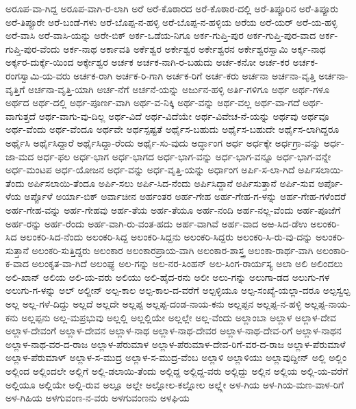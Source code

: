 ಅರೂಪ-ವಾ-ಗಿದ್ದ
ಅರೂಪ-ವಾಗಿ-ರ-ಲಾಗಿ
ಅರೆ
ಅರೆ-ಕೊಠಾರದ
ಅರೆ-ಕೊಠಾರ-ದಲ್ಲಿ
ಅರೆ-ತಿಪ್ಪೂರಿನ
ಅರೆ-ತಿಪ್ಪೂರು
ಅರೆ-ತಿಪ್ಪೂರೇ
ಅರೆ-ಬಂಡೆ-ಗಳು
ಅರೆ-ಬೊಪ್ಪ-ನ-ಹಳ್ಳಿ
ಅರೆ-ಬೊಪ್ಪ-ನ-ಹಳ್ಳಿಯ
ಅರೆಯ
ಅರೆ-ಯರ್
ಅರೆ-ಯ-ಹಳ್ಳಿ
ಅರೆ-ವಾಸಿ
ಅರೆ-ವಾಸಿ-ಯನ್ನು
ಅರೇ-ಬಿಕ್
ಅರ್ಕ-ಒಡೆಯ-ನಿಗೂ
ಅರ್ಕ-ಗುಪ್ತಿ-ಪುರ
ಅರ್ಕ-ಗುಪ್ತಿ-ಪುರ-ವಾದ
ಅರ್ಕ-ಗುಪ್ತಿ-ಪುರ-ವೆಂದು
ಅರ್ಕ-ನಾಥ
ಅರ್ಕಾವತಿ
ಅರ್ಕೆಶ್ವರ
ಅರ್ಕೇಶ್ವರ
ಅರ್ಕೇಶ್ವರನ
ಅರ್ಕೇಶ್ವರಸ್ವಾಮಿ
ಅರ್ಕ್ಕ-ನಾಥ
ಅರ್ಕ್ಕರ-ದುರ್ಕ್ಕೆ-ಯಿಂದ
ಅರ್ಕ್ಕೇಶ್ವರ
ಅರ್ಚಕ
ಅರ್ಚಕ-ನಾಗಿ-ರ-ಬಹುದು
ಅರ್ಚ-ಕನೋ
ಅರ್ಚ-ಕರ
ಅರ್ಚಕ-ರಂಗಸ್ವಾಮಿ-ಯ-ವರು
ಅರ್ಚಕ-ರಾಗಿ
ಅರ್ಚಕ-ರಿ-ಗಾಗಿ
ಅರ್ಚಕ-ರಿಗೆ
ಅರ್ಚ-ಕರು
ಅರ್ಚನಾ
ಅರ್ಚನಾ-ವೃತ್ತಿ
ಅರ್ಚನಾ-ವೃತ್ತಿಗೆ
ಅರ್ಚನಾ-ವೃತ್ತಿ-ಯಾಗಿ
ಅರ್ಚ-ನೆಗೆ
ಅರ್ಚನೆ-ಯನ್ನು
ಅರ್ಜುನ-ಹಳ್ಳಿ
ಅರ್ತಿ-ಗಳಿಗೂ
ಅರ್ಥ
ಅರ್ಥ-ಗಳೂ
ಅರ್ಥದ
ಅರ್ಥ-ದಲ್ಲಿ
ಅರ್ಥ-ಪೂರ್ಣ-ವಾಗಿ
ಅರ್ಥ-ವ-ನಿಕ್ಕಿ
ಅರ್ಥ-ವನ್ನು
ಅರ್ಥ-ವಲ್ಲ
ಅರ್ಥ-ವಾ-ಗದೆ
ಅರ್ಥ-ವಾಗುತ್ತದೆ
ಅರ್ಥ-ವಾಗು-ವು-ದಿಲ್ಲ
ಅರ್ಥ-ವಿದೆ
ಅರ್ಥ-ವಿದೆಯೇ
ಅರ್ಥ-ವಿವೇಚ-ನೆ-ಯನ್ನು
ಅರ್ಥವು
ಅರ್ಥವೂ
ಅರ್ಥ-ವೆಂದು
ಅರ್ಥ-ವೆಂದೂ
ಅರ್ಥವೇ
ಅರ್ಥಸ್ಪಷ್ಟತೆ
ಅರ್ಥೈಸ-ಬಹುದು
ಅರ್ಥೈಸ-ಬಹುದೇ
ಅರ್ಥೈಸ-ಲಾಗಿದ್ದರೂ
ಅರ್ಥೈಸಿ
ಅರ್ಥೈಸಿದ್ದಾರೆ
ಅರ್ಥೈಸಿದ್ದಾ-ರೆಂದು
ಅರ್ಥೈ-ಸು-ವುದು
ಅರ್ದ್ಧಾಂಗ
ಅರ್ಧ
ಅರ್ಧಕ್ಕೇ
ಅರ್ಧಗ್ರಾ-ವನ್ನು
ಅರ್ಧ-ಜಾ-ಮದ
ಅರ್ಧ-ಫಲ
ಅರ್ಧ-ಭಾಗ
ಅರ್ಧ-ಭಾಗದ
ಅರ್ಧ-ಭಾಗ-ವನ್ನು
ಅರ್ಧ-ಭಾಗ-ವನ್ನೂ
ಅರ್ಧ-ಭಾಗ-ವನ್ನೇ
ಅರ್ಧ-ಮಂಟಪ
ಅರ್ಧ-ಯೋಜನ
ಅರ್ಧ-ವನ್ನು
ಅರ್ಧ-ವೃತ್ತಿ-ಯನ್ನು
ಅರ್ಧಾಂಗ
ಅರ್ಪಿ-ಸ-ಲಾ-ಗಿದೆ
ಅರ್ಪಿಸಲಾಯಿ-ತೆಂದು
ಅರ್ಪಿಸಲಾಯಿ-ತೆಂದೂ
ಅರ್ಪಿ-ಸಲು
ಅರ್ಪಿ-ಸಿದ-ನೆಂದು
ಅರ್ಪಿಸಿದ್ದಾನೆ
ಅರ್ಪಿಸುತ್ತಾನೆ
ಅರ್ಪಿ-ಸುವ
ಅರ್ಪೊ-ಳೆಯ
ಅರ್ಪ್ಪೊಳೆ
ಅರ್ಯಾ-ಬಿಕ್
ಅರ್ವಾಚೀನ
ಅರ್ಹಂತರ
ಅರ್ಹ-ಗೇಹ
ಅರ್ಹ-ಗೇಹ-ಗ-ಳನ್ನು
ಅರ್ಹ-ಗೇಹ-ಗಳೆಂದರೆ
ಅರ್ಹ-ಗೇಹ-ವನ್ನು
ಅರ್ಹ-ಗೇಹವು
ಅರ್ಹ-ತೆಯ
ಅರ್ಹ-ತೆಯೂ
ಅರ್ಹ-ನಂದಿ
ಅರ್ಹ-ನಲ್ಲ-ವೆಂದು
ಅರ್ಹ-ಪೂಜೆಗೆ
ಅರ್ಹ-ರನ್ನು
ಅರ್ಹ-ರೆಂದು
ಅರ್ಹ-ವಾಗಿ-ರು-ವಂತ-ಹದು
ಅರ್ಹ-ವಾಗಿವೆ
ಅರ್ಹ-ವಾದ
ಅಱ-ಸಿದ-ಡೆಉ
ಅಲಂಕರಿ-ಸಿದ
ಅಲಂಕರಿ-ಸಿದ-ನೆಂದು
ಅಲಂಕರಿ-ಸಿದ್ದ
ಅಲಂಕರಿ-ಸಿದ್ದನು
ಅಲಂಕರಿ-ಸಿದ್ದರು
ಅಲಂಕರಿ-ಸಿ-ರು-ವು-ದನ್ನು
ಅಲಂಕರಿ-ಸುತ್ತಾನೆ
ಅಲಂಕರಿ-ಸುತ್ತಿದ್ದರು
ಅಲಂಕಾರ
ಅಲಂಕಾರಪ್ರಾಯ-ವಾಗಿ
ಅಲಂಕಾರ-ಶಾಸ್ತ್ರ
ಅಲಂಕಾ-ರಾರ್ಥ-ವಾಗಿ
ಅಲಂಕಾರಿ-ಕ-ವಾದ
ಅಲಂಕೃತ-ವಾ-ಗಿದೆ
ಅಲಂಘ್ಯ
ಅಲ-ಗನ್ನು
ಅಲ-ನರ-ಸಿಂಹನ್
ಅಲ-ಸಿಂಗ-ರಾರ್ಯಸ್ಯ
ಅಲಾ
ಅಲಿ
ಅಲಿಂದಲು
ಅಲಿ-ಖಾನ್
ಅಲಿಯ
ಅಲಿ-ಯ-ವರು
ಅಲಿಯು
ಅಲಿ-ಹೈದ-ರನು
ಅಲೀ
ಅಲು-ಗನ್ನು
ಅಲುಗಾ-ಡದ
ಅಲುಗು-ಗಳ
ಅಲುಗು-ಗ-ಳನ್ನು
ಅಲ್
ಅಲ್ದೀನ್
ಅಲ್ಪ-ಕಾಲ
ಅಲ್ಪ-ಕಾಲ-ದ-ವರೆಗೆ
ಅಲ್ಪಳ್ಳಿಯೂ
ಅಲ್ಪ-ಸಂಖ್ಯೆ-ಯಲ್ಲಾ-ದರೂ
ಅಲ್ಪಸ್ವಲ್ಪ
ಅಲ್ಲ
ಅಲ್ಲ-ಗಳೆ-ದಿದ್ದು
ಅಲ್ಲದೆ
ಅಲ್ಲದೇ
ಅಲ್ಲಪ್ಪ
ಅಲ್ಲಪ್ಪ-ದಂಡ-ನಾಯ-ಕನು
ಅಲ್ಲಪ್ಪನ
ಅಲ್ಲಪ್ಪ-ನ-ಹಳ್ಳಿ
ಅಲ್ಲಪ್ಪ-ನಾಯ-ಕನು
ಅಲ್ಲಪ್ಪನು
ಅಲ್ಲ-ಮಪ್ರಭುವು
ಅಲ್ಲಲ್ಲಿ
ಅಲ್ಲಲ್ಲಿಯೇ
ಅಲ್ಲಲ್ಲೇ
ಅಲ್ಲ-ವೆಂದು
ಅಲ್ಲಾಂಬಾ
ಅಲ್ಲಾಳ
ಅಲ್ಲಾಳ-ದೇವ
ಅಲ್ಲಾಳ-ದೇವಂಗೆ
ಅಲ್ಲಾಳ-ದೇವನ
ಅಲ್ಲಾಳ-ನಾಥ
ಅಲ್ಲಾಳ-ನಾಥ-ದೇವರ
ಅಲ್ಲಾಳ-ನಾಥ-ದೇವ-ರಿಗೆ
ಅಲ್ಲಾಳ-ನಾಥನ
ಅಲ್ಲಾಳ-ನಾಥ-ವರ-ದ-ರಾಜ
ಅಲ್ಲಾಳ-ಪೆರುಮಾಳ
ಅಲ್ಲಾಳ-ಪೆರುಮಾಳ-ದೇವ-ರಿಗೆ-ವರ-ದ-ರಾಜ
ಅಲ್ಲಾಳ-ಪೆರುಮಾಳೆ
ಅಲ್ಲಾಳ-ಪೆರುಮಾಳ್
ಅಲ್ಲಾಳ-ಸ-ಮುದ್ರ
ಅಲ್ಲಾಳ-ಸ-ಮುದ್ರ-ವೆಂಬ
ಅಲ್ಲಾಳಿ
ಅಲ್ಲಾಳಿಯು
ಅಲ್ಲಾವುದ್ದೀನ್
ಅಲ್ಲಿ
ಅಲ್ಲಿಂ
ಅಲ್ಲಿಂದ
ಅಲ್ಲಿಂದಲೇ
ಅಲ್ಲಿಗೆ
ಅಲ್ಲಿ-ಡಲಾಯಿ-ತೆಂದು
ಅಲ್ಲಿದ್ದ
ಅಲ್ಲಿದ್ದ-ವರು
ಅಲ್ಲಿದ್ದು
ಅಲ್ಲಿನ
ಅಲ್ಲಿಯ
ಅಲ್ಲಿ-ಯ-ವರೆಗೆ
ಅಲ್ಲಿಯೂ
ಅಲ್ಲಿಯೇ
ಅಲ್ಲಿ-ರುವ
ಅಲ್ಲೂ
ಅಲ್ಲೇ
ಅಲ್ಲೋಲ-ಕಲ್ಲೋಲ
ಅಲ್ಲ್ಲೇ
ಅಳ-ಗಿಯ
ಅಳ-ಗಿಯ-ಮಣ-ವಾಳ-ರಿಗೆ
ಅಳ-ಗಿಹಿಯ
ಅಳಗುವಂಣ-ನ-ವರು
ಅಳಗುವಂಣನು
ಅಳಘಿಯ
